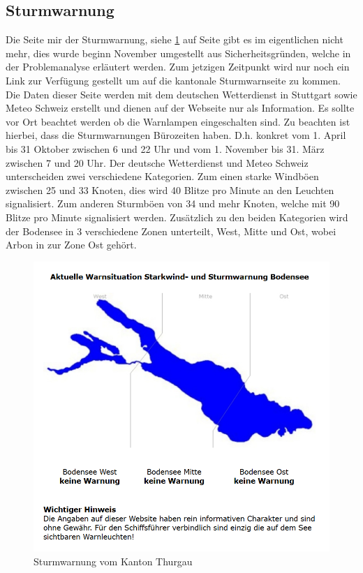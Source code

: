 \documentclass[a4paper,ngerman, 11pt, pagesize]{report}
\begin{document}
\subsection{Sturmwarnung}

Die Seite mir der Sturmwarnung, siehe \ref{img:Sturmwarnung} auf Seite \pageref{img:Sturmwarnung} gibt es im eigentlichen nicht mehr, dies wurde beginn November umgestellt aus Sicherheitsgründen, welche in der Problemanalyse erläutert werden. Zum jetzigen Zeitpunkt wird nur noch ein Link zur Verfügung gestellt um auf die kantonale Sturmwarnseite zu kommen. Die Daten dieser Seite werden mit dem deutschen Wetterdienst in Stuttgart sowie Meteo Schweiz erstellt und dienen auf der Webseite nur als Information. Es sollte vor Ort beachtet werden ob die Warnlampen eingeschalten sind. Zu beachten ist hierbei, dass die Sturmwarnungen Bürozeiten haben. D.h. konkret vom 1. April bis 31 Oktober zwischen 6 und 22 Uhr und vom 1. November bis 31. März zwischen 7 und 20 Uhr. Der deutsche Wetterdienst und Meteo Schweiz unterscheiden zwei verschiedene Kategorien. Zum einen starke Windböen zwischen 25 und 33 Knoten, dies wird 40 Blitze pro Minute an den Leuchten signalisiert. Zum anderen Sturmböen von 34 und mehr Knoten, welche mit 90 Blitze pro Minute signalisiert werden. Zusätzlich zu den beiden Kategorien wird der Bodensee in 3 verschiedene Zonen unterteilt, West, Mitte und Ost, wobei Arbon in zur Zone Ost gehört. 
\begin{figure}[htbp]
	\centering
	\includegraphics[width=0.9\linewidth]{img/sturmwarnung}
	\caption{Sturmwarnung vom Kanton Thurgau}
	\label{img:Sturmwarnung}
\end{figure}
\end{document}
